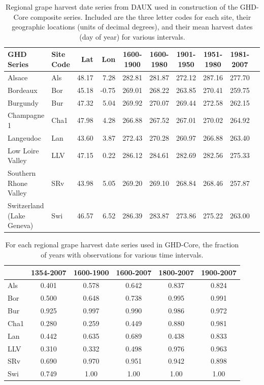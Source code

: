 \documentclass[12pt]{article}
\begin{document}
\begin{table}
\small
\caption{\small Regional grape harvest date series from DAUX used in construction of the GHD-Core composite series. Included are the three letter codes for each site, their geographic locations (units of decimal degrees), and their mean harvest dates (day of year) for various intervals.}
\centering
\begin{tabular}{l l | r r | c c c c c p{5cm} |}
\hline
 \bf GHD Series & \bf Site Code & \bf Lat & \bf Lon & \bf 1600-1900 & \bf 1600-1980 & \bf 1901-1950 & \bf 1951-1980 & \bf 1981-2007 \\
\hline
Alsace	& Als & 48.17 & 7.28 & 282.81 & 281.87 & 272.12 & 287.16	 & 277.70 \\
Bordeaux	& Bor	& 45.18 & -0.75	& 269.01 & 	268.22	&  263.85 &  270.41 &  259.75\\
Burgundy	& Bur	& 47.32	& 5.04	& 269.92	& 270.07	& 269.44	& 272.58	& 262.15\\
Champagne 1	& Cha1	& 47.98	& 4.28	& 266.88	& 267.52	& 267.01	& 270.02	& 264.92\\
Langeudoc & Lan	& 43.60 & 3.87	& 272.43 &	270.28	& 260.97	& 266.88	& 263.40\\
Low Loire Valley	& LLV	& 47.15	& 0.22	& 286.12	& 284.61	& 282.69	& 282.56	& 275.33\\
Southern Rhone Valley	& SRv	& 43.98	& 5.05	& 269.20	& 269.10	& 268.84	& 268.46	& 257.87\\
Switzerland (Lake Geneva)	& Swi	& 46.57	& 6.52	& 286.39	& 283.87	& 273.86	& 275.22	& 263.00\\
\hline
\end{tabular}
\end{table}

\begin{table}
\small
\caption{\small For each regional grape harvest date series used in GHD-Core, the fraction of years with observations for various time intervals.}
\centering
\begin{tabular}{l c c c c c}
\hline
 & \bf 1354-2007 & \bf 1600-1900 & \bf 1600-2007 & \bf 1800-2007 & \bf 1900-2007\\
\hline
Als	& 0.401 & 0.578 & 0.642 & 0.837	 & 0.824\\
Bor	 & 0.500 & 0.648 & 0.738 & 0.995 & 0.991\\
Bur & 	0.925	& 0.997	& 0.990	& 0.986	& 0.972\\
Cha1	& 0.280	& 0.259	& 0.449	& 0.880	& 0.981\\
Lan	& 0.442 & 0.635	& 0.689	& 0.438	& 0.833\\
LLV	& 0.310	& 0.332	& 0.498	& 0.976	& 0.963\\
SRv	& 0.690	& 0.970	& 0.951	& 0.942	& 0.898\\
Swi 	& 0.749	& 1.00 & 1.00	& 1.00	& 1.00\\
\hline
\end{tabular}
\end{table}
\end{document}
